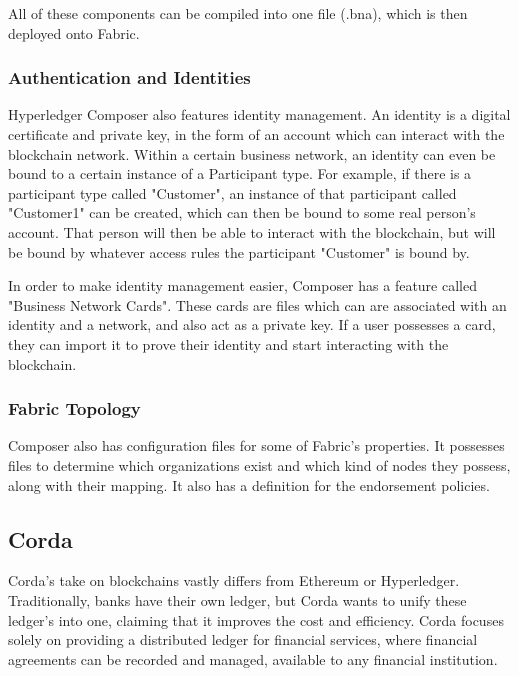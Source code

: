 
All of these components can be compiled into one file (.bna), which is then deployed onto Fabric.

\subsubsection{Authentication and Identities}

Hyperledger Composer also features identity management. An identity is a digital certificate and private key, in the form of an account which can interact with the blockchain network. Within a certain business network, an identity can even be bound to a certain instance of a Participant type. For example, if there is a participant type called "Customer", an instance of that participant called "Customer1" can be created, which can then be bound to some real person's account. That person will then be able to interact with the blockchain, but will be bound by whatever access rules the participant "Customer" is bound by. 

In order to make identity management easier, Composer has a feature called "Business Network Cards". These cards are files which can are associated with an identity and a network, and also act as a private key. If a user possesses a card, they can import it to prove their identity and start interacting with the blockchain.

\subsubsection{Fabric Topology}

Composer also has configuration files for some of Fabric's properties. It possesses files to determine which organizations exist and which kind of nodes they possess, along with their mapping. It also has a definition for the endorsement policies.


\subsection{Corda}
Corda's take on blockchains vastly differs from Ethereum or Hyperledger. Traditionally, banks have their own ledger, but Corda wants to unify these ledger's into one, claiming that it improves the cost and efficiency. Corda focuses solely on providing a distributed ledger for financial services, where financial agreements can be recorded and managed, available to any financial institution\cite{Brown2016}. 

